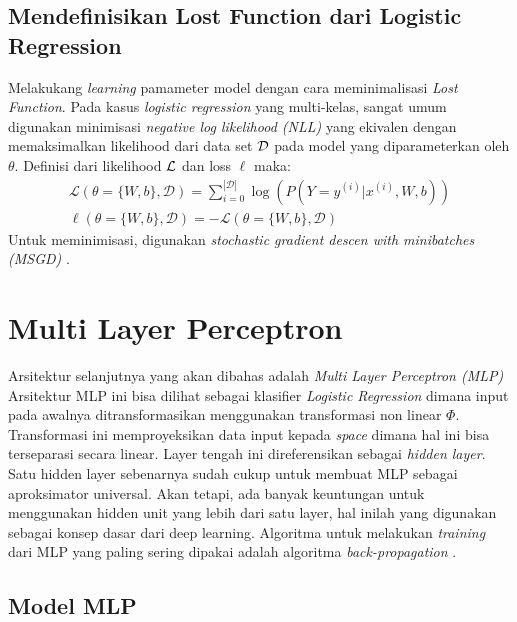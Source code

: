 \subsection{Mendefinisikan Lost Function dari Logistic Regression}
Melakukang \textit{learning} pamameter model dengan cara meminimalisasi \textit{Lost Function}. Pada kasus \textit{logistic regression} yang multi-kelas, sangat umum digunakan minimisasi \textit{negative log likelihood (NLL)} yang ekivalen dengan memaksimalkan likelihood dari data set $\cal{D}$ pada model yang diparameterkan oleh $\theta$. Definisi dari likelihood $\cal{L}$ dan loss $\ell$ maka:
\begin{equation}
\begin{aligned}
\mathcal{L} (\theta=\{W,b\}, \mathcal{D}) =
  \sum_{i=0}^{|\mathcal{D}|} \log(P(Y=y^{(i)}|x^{(i)}, W,b)) \\
\ell (\theta=\{W,b\}, \mathcal{D}) = - \mathcal{L} (\theta=\{W,b\}, \mathcal{D})
\end{aligned}
\end{equation}
Untuk meminimisasi, digunakan \textit{stochastic gradient descen with minibatches (MSGD)} \citep{tutorial2014lisa}.


\section{Multi Layer Perceptron}

Arsitektur selanjutnya yang akan dibahas adalah \textit{Multi Layer Perceptron (MLP)} Arsitektur MLP ini bisa dilihat sebagai klasifier \textit{Logistic Regression} dimana input pada awalnya ditransformasikan menggunakan transformasi non linear $\Phi$. Transformasi ini memproyeksikan data input kepada \textit{space} dimana hal ini bisa terseparasi secara linear. Layer tengah ini direferensikan sebagai \textit{hidden layer}. Satu hidden layer sebenarnya sudah cukup untuk membuat MLP sebagai aproksimator universal. Akan tetapi, ada banyak keuntungan untuk menggunakan hidden unit yang lebih dari satu layer, hal inilah yang digunakan sebagai konsep dasar dari deep learning. Algoritma untuk melakukan \textit{training} dari MLP yang paling sering dipakai adalah algoritma \textit{back-propagation} \citep{tutorial2014lisa}.

\subsection{Model MLP}

